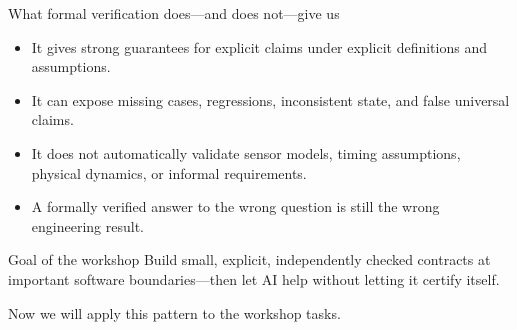 \documentclass[aspectratio=169,10pt]{beamer}
\begin{document}
\begin{frame}{What formal verification does---and does not---give us}
  \begin{itemize}
    \item It gives strong guarantees for explicit claims under explicit
          definitions and assumptions.
    \item It can expose missing cases, regressions, inconsistent state, and
          false universal claims.
    \item It does not automatically validate sensor models, timing assumptions,
          physical dynamics, or informal requirements.
    \item A formally verified answer to the wrong question is still the wrong
          engineering result.
  \end{itemize}

  \begin{block}{Goal of the workshop}
    Build small, explicit, independently checked contracts at important
    software boundaries---then let AI help without letting it certify itself.
  \end{block}

  \begin{center}
    \alert{Now we will apply this pattern to the workshop tasks.}
  \end{center}
\end{frame}
\end{document}
